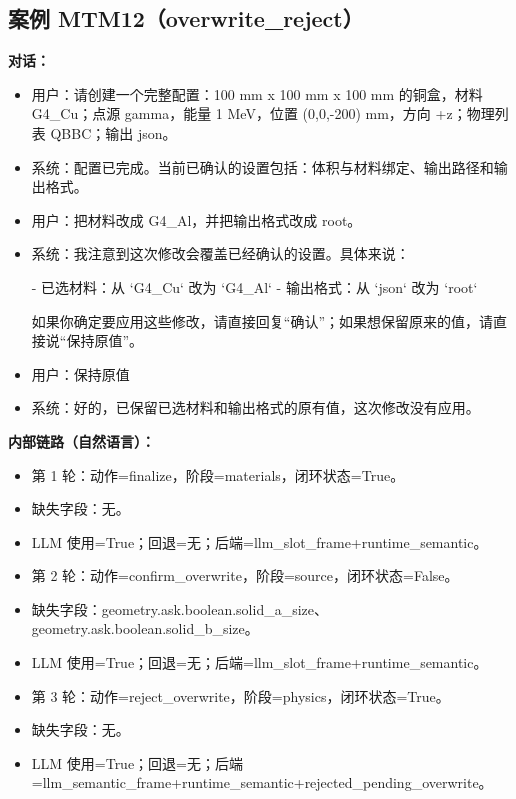 \documentclass[11pt]{ctexart}
\begin{document}
\subsection{案例 MTM12（overwrite\_reject）}
\textbf{对话：}
\begin{itemize}
\item 用户：请创建一个完整配置：100 mm x 100 mm x 100 mm 的铜盒，材料 G4\_Cu；点源 gamma，能量 1 MeV，位置 (0,0,-200) mm，方向 +z；物理列表 QBBC；输出 json。
\item 系统：配置已完成。当前已确认的设置包括：体积与材料绑定、输出路径和输出格式。
\item 用户：把材料改成 G4\_Al，并把输出格式改成 root。
\item 系统：我注意到这次修改会覆盖已经确认的设置。具体来说：

- 已选材料：从 `G4\_Cu` 改为 `G4\_Al`
- 输出格式：从 `json` 改为 `root`

如果你确定要应用这些修改，请直接回复“确认”；如果想保留原来的值，请直接说“保持原值”。
\item 用户：保持原值
\item 系统：好的，已保留已选材料和输出格式的原有值，这次修改没有应用。
\end{itemize}
\textbf{内部链路（自然语言）：}
\begin{itemize}
\item 第 1 轮：动作=finalize，阶段=materials，闭环状态=True。
\item 缺失字段：无。
\item LLM 使用=True；回退=无；后端=llm\_slot\_frame+runtime\_semantic。
\item 第 2 轮：动作=confirm\_overwrite，阶段=source，闭环状态=False。
\item 缺失字段：geometry.ask.boolean.solid\_a\_size、geometry.ask.boolean.solid\_b\_size。
\item LLM 使用=True；回退=无；后端=llm\_slot\_frame+runtime\_semantic。
\item 第 3 轮：动作=reject\_overwrite，阶段=physics，闭环状态=True。
\item 缺失字段：无。
\item LLM 使用=True；回退=无；后端=llm\_semantic\_frame+runtime\_semantic+rejected\_pending\_overwrite。
\end{itemize}
\end{document}
